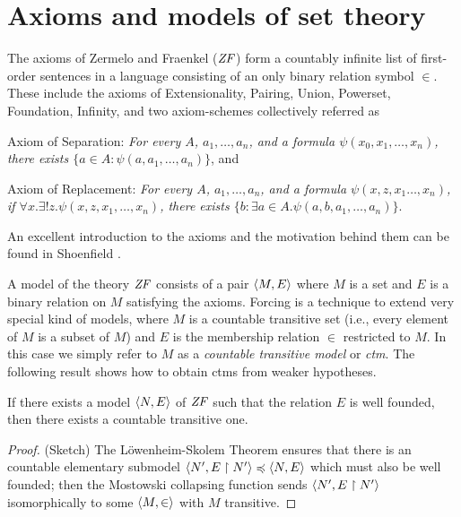 \section{Axioms and models of set theory}
\label{sec:axioms-models-set-theory}

The axioms of Zermelo and Fraenkel ($\mathit{ZF}$) form a
countably infinite list of first-order sentences in a language
consisting of an only binary relation symbol $\in$. These include the
axioms of Extensionality, Pairing, Union, Powerset, Foundation, Infinity, and two
axiom-schemes collectively referred as
\begin{inlinelist}[label=(\emph{\alph*})]
\item Axiom of Separation:
\emph{For every $A$, $a_1,\dots,a_n$,  and  a formula
  $\psi(x_0,x_1,\dots,x_n)$, there exists $\{a\in  A:
  \psi(a,a_1,\dots,a_n)\}$}, 
and \item Axiom of Replacement: \emph{For every $A$, $a_1,\dots,a_n$,  and
  a formula   $\psi(x,z,x_1\dots,x_n)$, if 
  $\forall x.\exists!z.\psi(x,z,x_1,\dots,x_n)$,  there exists 
  $\{b : \exists a\in A. \psi(a,b,a_1,\dots,a_n)\}$}.
\end{inlinelist}
An excellent introduction to the axioms and the motivation behind them
can be found in Shoenfield \cite{MR3727410}. 

A model of the theory $\mathit{ZF}$ consists of a pair $\langle M,E\rangle$ where $M$
is a set and $E$ is a binary relation on $M$ satisfying the
axioms. Forcing is a technique 
to extend very special kind of models, where $M$ is a countable
transitive set (i.e., every element of $M$ is a subset of $M$) and
$E$ is the membership relation $\in$ restricted to $M$. In this case
we simply refer to $M$ as a \emph{countable transitive model} or
\emph{ctm}. The following result shows how to obtain ctms from weaker
hypotheses. 
%
\begin{lemma}\label{lem:wf-model-implies-ctm}
  If there exists  a
  model  $\langle N,E\rangle$  of $\mathit{ZF}$ such that the relation $E$ is well
  founded, then there exists a countable transitive one.
\end{lemma}
\begin{proof}
  (Sketch) The L\"owenheim-Skolem 
  Theorem ensures that there is an countable elementary submodel 
  $\langle N',E\upharpoonright N'\rangle\preccurlyeq  \langle N,E\rangle$ which must also be
  well founded; then the 
  Mostowski collapsing function \cite[Def.~I.9.31]{kunen2011set} sends $\langle
  N',E\upharpoonright N'\rangle$ 
  isomorphically to some $\langle M,\in\rangle$ with  $M$ transitive.
\end{proof}

